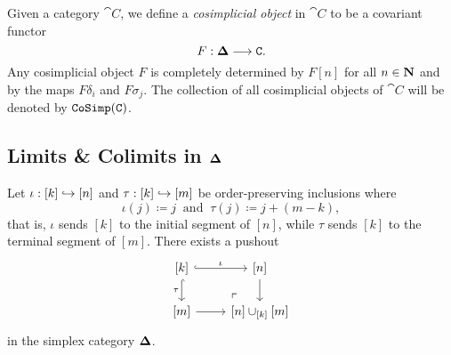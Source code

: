 \begin{definition}
    \label{def:cosimp-obj}
    Given a category \(\cat C\), we define a \emph{cosimplicial object} in
    \(\cat C\) to be a covariant functor
    \[
        F: {\mathbf{\Delta}} \longrightarrow \texttt C.
    \]
    Any cosimplicial object \(F\) is completely determined by \(F [n]\) for all
    \(n \in \mathbf{N}\) and by the maps \(F \delta_i\) and \(F \sigma_j\). The collection
    of all cosimplicial objects of \(\cat C\) will be denoted by
    \({\texttt{CoSimp}(\texttt C)}\).
\end{definition}

\subsection{Limits \& Colimits in \texorpdfstring{\({\mathbf{\Delta}}\)}{Delta}}

\begin{lemma}
    \label{lem:splx-cat-pushout-injections}
    Let \(\iota: [k] \hookrightarrow [n]\) and \(\tau: [k] \hookrightarrow [m]\) be order-preserving
    inclusions where
    \[
        \iota(j) \coloneq j\ \text{ and }\ \tau(j) \coloneq j + (m - k),
    \]
    that is, \(\iota\) sends \([k]\) to the initial segment of \([n]\), while
    \(\tau\) sends \([k]\) to the terminal segment of \([m]\). There exists a
    pushout
    \[
        \begin{tikzcd}
            {[k]} \ar[r, hook, "\iota"] \ar[d, hook, "\tau"']
            \ar[rd, "\ulcorner", very near end, phantom]
            &{[n]} \ar[d] \\
            {[m]} \ar[r] &{[n] \cup_{[k]} [m]}
        \end{tikzcd}
    \]
    in the simplex category \({\mathbf{\Delta}}\).
\end{lemma}

